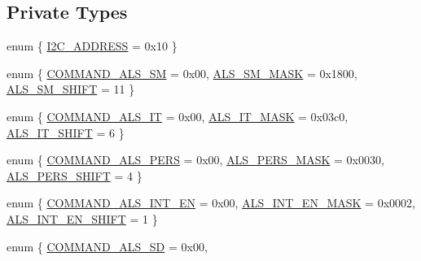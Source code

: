 \subsection*{Private Types}
\begin{DoxyCompactItemize}
\item 
enum \{ \hyperlink{classVEML7700_ab63c7a3f732769f87046a7fe517fa5d2a89ac7a0c3d5299cc896db94f3f11ad3b}{I2\+C\+\_\+\+A\+D\+D\+R\+E\+SS} = 0x10
 \}
\item 
enum \{ \hyperlink{classVEML7700_a4173dfe44f2cce96da124bdecab4cea9a4f94aea0ea0bd1f3ddde34f141fb40b0}{C\+O\+M\+M\+A\+N\+D\+\_\+\+A\+L\+S\+\_\+\+SM} = 0x00, 
\hyperlink{classVEML7700_a4173dfe44f2cce96da124bdecab4cea9a0cc9ee77ebfb54f10e8e0b310557e8bc}{A\+L\+S\+\_\+\+S\+M\+\_\+\+M\+A\+SK} = 0x1800, 
\hyperlink{classVEML7700_a4173dfe44f2cce96da124bdecab4cea9a267f0498d6ffd9942d82af76204cdf94}{A\+L\+S\+\_\+\+S\+M\+\_\+\+S\+H\+I\+FT} = 11
 \}
\item 
enum \{ \hyperlink{classVEML7700_a8fc60ed332ae2b50905f477742e155c5ae6b6537105961e230f3c3bd922af64e7}{C\+O\+M\+M\+A\+N\+D\+\_\+\+A\+L\+S\+\_\+\+IT} = 0x00, 
\hyperlink{classVEML7700_a8fc60ed332ae2b50905f477742e155c5a3a76e5f3bed2f727dc77529203b4709d}{A\+L\+S\+\_\+\+I\+T\+\_\+\+M\+A\+SK} = 0x03c0, 
\hyperlink{classVEML7700_a8fc60ed332ae2b50905f477742e155c5a6a0ef54484f8ca1e5e9fc40e5268ea9b}{A\+L\+S\+\_\+\+I\+T\+\_\+\+S\+H\+I\+FT} = 6
 \}
\item 
enum \{ \hyperlink{classVEML7700_a29c6b040874a46d6911a8e78566057b7a4c3ed42cb54ed1d56e233cb2b63a7af9}{C\+O\+M\+M\+A\+N\+D\+\_\+\+A\+L\+S\+\_\+\+P\+E\+RS} = 0x00, 
\hyperlink{classVEML7700_a29c6b040874a46d6911a8e78566057b7a3e52078f4c2aa271762fa258b542756e}{A\+L\+S\+\_\+\+P\+E\+R\+S\+\_\+\+M\+A\+SK} = 0x0030, 
\hyperlink{classVEML7700_a29c6b040874a46d6911a8e78566057b7aac2f5794157be86c64a3304676a50801}{A\+L\+S\+\_\+\+P\+E\+R\+S\+\_\+\+S\+H\+I\+FT} = 4
 \}
\item 
enum \{ \hyperlink{classVEML7700_a6e9e3003ac094c096b9095a3ceb9faaeab1bae27fdd79e5fd8f79dfa27cbdb147}{C\+O\+M\+M\+A\+N\+D\+\_\+\+A\+L\+S\+\_\+\+I\+N\+T\+\_\+\+EN} = 0x00, 
\hyperlink{classVEML7700_a6e9e3003ac094c096b9095a3ceb9faaea6f3348962ed45d34cafcdeff49792472}{A\+L\+S\+\_\+\+I\+N\+T\+\_\+\+E\+N\+\_\+\+M\+A\+SK} = 0x0002, 
\hyperlink{classVEML7700_a6e9e3003ac094c096b9095a3ceb9faaea698db2febefb152579472c9aeee16f71}{A\+L\+S\+\_\+\+I\+N\+T\+\_\+\+E\+N\+\_\+\+S\+H\+I\+FT} = 1
 \}
\item 
enum \{ \hyperlink{classVEML7700_afba237ed01b4949e9aeb96151f9273b5ae4acf5f5dc8e4039bdc97cdb84c3d668}{C\+O\+M\+M\+A\+N\+D\+\_\+\+A\+L\+S\+\_\+\+SD} = 0x00, 

\end{DoxyCompactItemize}
